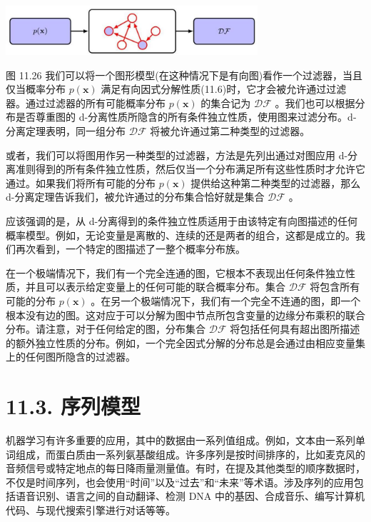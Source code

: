 \documentclass[10pt]{article}
\begin{document}
\begin{center}
\includegraphics[max width=0.7\textwidth]{images/0194e279-9b28-703a-88f4-c3ac21e2010d_368_573_345_920_180_0.jpg}
\end{center}
\hspace*{3em} 

图 11.26 我们可以将一个图形模型(在这种情况下是有向图)看作一个过滤器，当且仅当概率分布 \(p\left( \mathbf{x}\right)\) 满足有向因式分解性质(11.6)时，它才会被允许通过过滤器。通过过滤器的所有可能概率分布 \(p\left( \mathbf{x}\right)\) 的集合记为 \(\mathcal{D}\mathcal{F}\) 。我们也可以根据分布是否尊重图的 d-分离性质所隐含的所有条件独立性质，使用图来过滤分布。d-分离定理表明，同一组分布 \(\mathcal{D}\mathcal{F}\) 将被允许通过第二种类型的过滤器。

或者，我们可以将图用作另一种类型的过滤器，方法是先列出通过对图应用 d-分离准则得到的所有条件独立性质，然后仅当一个分布满足所有这些性质时才允许它通过。如果我们将所有可能的分布 \(p\left( \mathbf{x}\right)\) 提供给这种第二种类型的过滤器，那么 d-分离定理告诉我们，被允许通过的分布集合恰好就是集合 \(\mathcal{D}\mathcal{F}\) 。

应该强调的是，从 d-分离得到的条件独立性质适用于由该特定有向图描述的任何概率模型。例如，无论变量是离散的、连续的还是两者的组合，这都是成立的。我们再次看到，一个特定的图描述了一整个概率分布族。

在一个极端情况下，我们有一个完全连通的图，它根本不表现出任何条件独立性质，并且可以表示给定变量上的任何可能的联合概率分布。集合 \(\mathcal{D}\mathcal{F}\) 将包含所有可能的分布 \(p\left( \mathbf{x}\right)\) 。在另一个极端情况下，我们有一个完全不连通的图，即一个根本没有边的图。这对应于可以分解为图中节点所包含变量的边缘分布乘积的联合分布。请注意，对于任何给定的图，分布集合 \(\mathcal{D}\mathcal{F}\) 将包括任何具有超出图所描述的额外独立性质的分布。例如，一个完全因式分解的分布总是会通过由相应变量集上的任何图所隐含的过滤器。

\section*{11.3. 序列模型}

机器学习有许多重要的应用，其中的数据由一系列值组成。例如，文本由一系列单词组成，而蛋白质由一系列氨基酸组成。许多序列是按时间排序的，比如麦克风的音频信号或特定地点的每日降雨量测量值。有时，在提及其他类型的顺序数据时，不仅是时间序列，也会使用“时间”以及“过去”和“未来”等术语。涉及序列的应用包括语音识别、语言之间的自动翻译、检测 DNA 中的基因、合成音乐、编写计算机代码、与现代搜索引擎进行对话等等。
\end{document}
